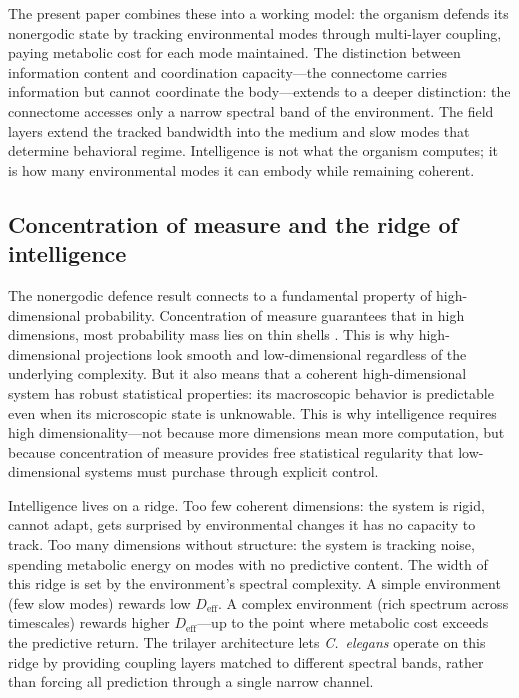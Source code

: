 \documentclass[12pt]{article}
\newcommand{\Deff}{D_{\mathrm{eff}}}
\begin{document}
The present paper combines these into a working model: the organism defends its nonergodic state by tracking environmental modes through multi-layer coupling, paying metabolic cost for each mode maintained. The distinction between information content and coordination capacity---the connectome carries information but cannot coordinate the body---extends to a deeper distinction: the connectome accesses only a narrow spectral band of the environment. The field layers extend the tracked bandwidth into the medium and slow modes that determine behavioral regime. Intelligence is not what the organism computes; it is how many environmental modes it can embody while remaining coherent.

\subsection{Concentration of measure and the ridge of intelligence}
\label{sec:concentration}

The nonergodic defence result connects to a fundamental property of high-dimensional probability. Concentration of measure guarantees that in high dimensions, most probability mass lies on thin shells \cite{todd2025falsifiability}. This is why high-dimensional projections look smooth and low-dimensional regardless of the underlying complexity. But it also means that a coherent high-dimensional system has robust statistical properties: its macroscopic behavior is predictable even when its microscopic state is unknowable. This is why intelligence requires high dimensionality---not because more dimensions mean more computation, but because concentration of measure provides free statistical regularity that low-dimensional systems must purchase through explicit control.

Intelligence lives on a ridge. Too few coherent dimensions: the system is rigid, cannot adapt, gets surprised by environmental changes it has no capacity to track. Too many dimensions without structure: the system is tracking noise, spending metabolic energy on modes with no predictive content. The width of this ridge is set by the environment's spectral complexity. A simple environment (few slow modes) rewards low $\Deff$. A complex environment (rich spectrum across timescales) rewards higher $\Deff$---up to the point where metabolic cost exceeds the predictive return. The trilayer architecture lets \textit{C.~elegans} operate on this ridge by providing coupling layers matched to different spectral bands, rather than forcing all prediction through a single narrow channel.
\end{document}
